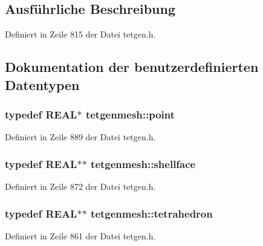 \subsection{Ausführliche Beschreibung}


Definiert in Zeile 815 der Datei tetgen.\-h.



\subsection{Dokumentation der benutzerdefinierten Datentypen}
\hypertarget{classtetgenmesh_ace3fb4f80389185b7c9b18ab69a3dea2}{
\subsubsection[{point}]{\setlength{\rightskip}{0pt plus 5cm}typedef {\bf R\-E\-A\-L}$\ast$ {\bf tetgenmesh\-::point}}}\label{classtetgenmesh_ace3fb4f80389185b7c9b18ab69a3dea2}


Definiert in Zeile 889 der Datei tetgen.\-h.

\hypertarget{classtetgenmesh_ad4860123b88783b943fa6452e886a2cb}{
\subsubsection[{shellface}]{\setlength{\rightskip}{0pt plus 5cm}typedef {\bf R\-E\-A\-L}$\ast$$\ast$ {\bf tetgenmesh\-::shellface}}}\label{classtetgenmesh_ad4860123b88783b943fa6452e886a2cb}


Definiert in Zeile 872 der Datei tetgen.\-h.

\hypertarget{classtetgenmesh_a6a12b1c0d1834ca941d16c62e949e5e3}{
\subsubsection[{tetrahedron}]{\setlength{\rightskip}{0pt plus 5cm}typedef {\bf R\-E\-A\-L}$\ast$$\ast$ {\bf tetgenmesh\-::tetrahedron}}}\label{classtetgenmesh_a6a12b1c0d1834ca941d16c62e949e5e3}


Definiert in Zeile 861 der Datei tetgen.\-h.



